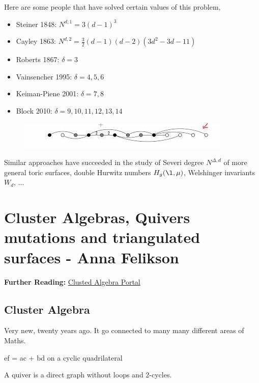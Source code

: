 \documentclass{article}
\begin{document}
\begin{eg} Here are some people that have solved certain values of this problem,
  \begin{itemize}
    \item Steiner 1848: $N^{d,1} = 3(d - 1)^3$
    \item Cayley 1863: $N^{d,2} = \frac{3}{2}(d - 1)(d-2)(3d^2 - 3d - 11)$
    \item Roberts 1867: $\delta = 3$
    \item Vainsencher 1995: $\delta = 4, 5, 6$
    \item Keiman-Piene 2001: $\delta = 7,8$
    \item Block 2010: $\delta = 9, 10, 11, 12, 13, 14$
  \end{itemize}
  \begin{figure}[!ht]
  \centering
  \includegraphics{./figures/L2.11}
  \end{figure}
\end{eg}

Similar approaches have succeeded in the study of Severi degree $N^{\Delta, d}$ of more general toric surfaces, double Hurwitz numbers $H_g(\l, \mu)$, Welshinger invariants $W_d$, ...


\section{Cluster Algebras, Quivers mutations and triangulated surfaces - Anna Felikson}

\textbf{Further Reading:} \href{http://www.math.lsa.umich.edu/~fomin/cluster.html}{Clusted Algebra Portal}\\

\subsection{Cluster Algebra}
Very new, twenty years ago. It go connected to many many different areas of Maths.

\begin{nthm}
  ef = ac + bd on a cyclic quadrilateral
\end{nthm}


\begin{ndefi}[Quiver]
  A quiver is a direct graph without loops and 2-cycles.
\end{ndefi}
\end{document}
